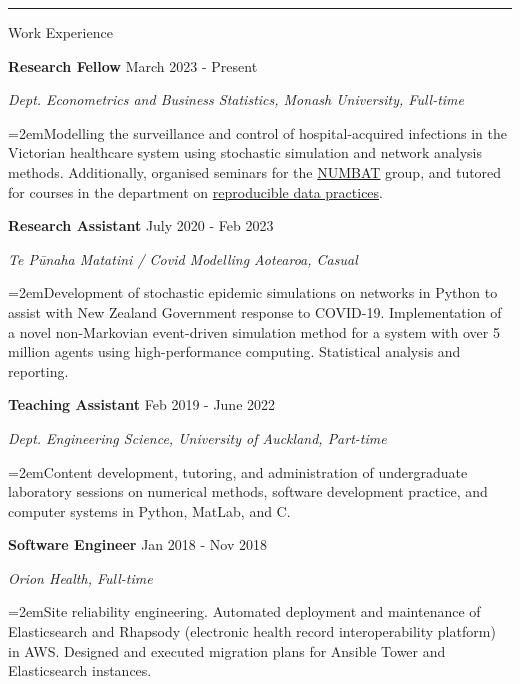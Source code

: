 \documentclass[paper=a4paper,fontsize=11pt]{scrartcl}
\newcommand{\pagerule}[1][2pt]{\noindent\rule{\textwidth}{#1}}
\newcommand{\usingfont}[2]{#1 #2 \par \normalsize \normalfont}
\newcommand{\sectionheader}[1]{\pagerule \vspace{0.05ex} \usingfont{\usefont{T1}{phv}{m}{v} \Large}{\noindent \hspace{-0.5em} #1} \vspace{0.75ex}}
\newcommand{\indented}[1][2em]{\noindent\hangindent=#1\hangafter=0}
\begin{document}
\sectionheader{Work Experience}
\noindent \textbf{Research Fellow} \hfill
{March 2023 - Present} \par
\noindent \textit{Dept. Econometrics and Business Statistics, Monash
University, Full-time} \par
\indented \small {Modelling the surveillance and control of
hospital-acquired infections in the Victorian healthcare system using
stochastic simulation and network analysis methods. Additionally,
organised seminars for the \href{https://numbat.space}{NUMBAT} group,
and tutored for courses in the department on
\href{https://handbook.monash.edu/2024/units/ETC5513}{reproducible data
practices}.}
\normalsize \par\par
\noindent \textbf{Research Assistant} \hfill
{July 2020 - Feb 2023} \par
\noindent \textit{Te Pūnaha Matatini / Covid Modelling
Aotearoa, Casual} \par
\indented \small {Development of stochastic epidemic simulations on
networks in Python to assist with New Zealand Government response to
COVID-19. Implementation of a novel non-Markovian event-driven
simulation method for a system with over 5 million agents using
high-performance computing. Statistical analysis and reporting.}
\normalsize \par\par
\noindent \textbf{Teaching Assistant} \hfill
{Feb 2019 - June 2022} \par
\noindent \textit{Dept. Engineering Science, University of
Auckland, Part-time} \par
\indented \small {Content development, tutoring, and administration of
undergraduate laboratory sessions on numerical methods, software
development practice, and computer systems in Python, MatLab, and C.}
\normalsize \par\par
\noindent \textbf{Software Engineer} \hfill
{Jan 2018 - Nov 2018} \par
\noindent \textit{Orion Health, Full-time} \par
\indented \small {Site reliability engineering. Automated deployment and
maintenance of Elasticsearch and Rhapsody (electronic health record
interoperability platform) in AWS. Designed and executed migration plans
for Ansible Tower and Elasticsearch instances.}
\normalsize \par\par
\end{document}
